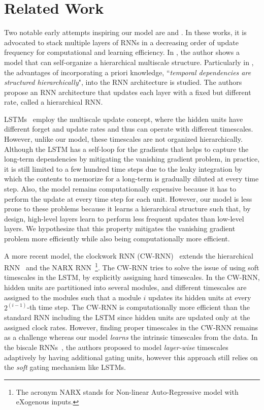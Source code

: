 \documentclass{article} %
\begin{document}
\section{Related Work}
\label{sec:related_work}
Two notable early attempts inspiring our model are \citet{schmidhuber1992learning} and \citet{el1995hierarchical}. 
In these works, it is advocated to stack multiple layers of RNNs in a decreasing order of update frequency for computational and learning efficiency. 
In \citet{schmidhuber1992learning}, the author shows a model that can self-organize a hierarchical multiscale structure.
Particularly in \citet{el1995hierarchical}, the advantages of incorporating a priori knowledge,
``\textit{temporal dependencies are structured hierarchically}", into the RNN architecture is studied.
The authors propose an RNN architecture that updates each layer with a fixed but different rate, called a hierarchical RNN.

LSTMs~\citep{hochreiter1997long} employ the multiscale update concept, where
the hidden units have different forget and update rates and thus can operate with different timescales. 
However, unlike our model, these timescales are not organized hierarchically. 
Although the LSTM has a self-loop for the gradients that helps to capture the long-term dependencies by mitigating the vanishing gradient problem,
in practice, it is still limited to a few hundred time steps due to the leaky integration by which the contents 
to memorize for a long-term is gradually diluted at every time step. 
Also, the model remains computationally expensive because it has to perform the update at every time step for each unit. 
However, our model is less prone to these problems because it learns a hierarchical structure such that, by design, high-level layers learn to perform less frequent updates than low-level layers. 
We hypothesize that this property mitigates the vanishing gradient problem more efficiently while also being computationally more efficient. 

A more recent model, the clockwork RNN (CW-RNN)~\citep{koutnik2014clockwork} extends the hierarchical RNN~\citep{el1995hierarchical}
and the NARX RNN~\citep{lin1996learning}\footnote{The acronym NARX stands for Non-linear Auto-Regressive model with eXogenous inputs.}.
The CW-RNN tries to solve the issue of using soft timescales in the LSTM, by explicitly assigning hard timescales. 
In the CW-RNN, hidden units are partitioned into several modules, and different timescales are assigned to 
the modules such that a module $i$ updates its hidden units at every $2^{(i-1)}$-th time step. 
The CW-RNN is computationally more efficient than the standard RNN including the LSTM 
since hidden units are updated only at the assigned clock rates. 
However, finding proper timescales in the CW-RNN remains as a challenge
whereas our model \textit{learns} the intrinsic timescales from the data. 
In the biscale RNNs~\citep{chung2016character}, the authors proposed to model \textit{layer-wise} timescales
adaptively by having additional gating units, however this approach still relies on the \textit{soft} gating mechanism like LSTMs.
\end{document}
